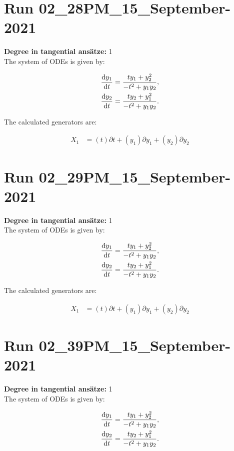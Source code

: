 \section*{Run 02\_28PM\_15\_September-2021}
\textbf{Degree in tangential ansätze:}	1\\
The system of ODEs is given by:

\begin{align*}
\dv{y_{1}}{t}&=\frac{t y_{1} + y_{2}^{2}}{- t^{2} + y_{1} y_{2}},\\
\dv{y_{2}}{t}&=\frac{t y_{2} + y_{1}^{2}}{- t^{2} + y_{1} y_{2}}.\\
\end{align*}

\noindent The calculated generators are:

\begin{align*}
X_{1}&=\left( t \right)\partial t+\left( y_{1} \right)\partial y_{1}+\left( y_{2} \right)\partial y_{2}\end{align*}
\section*{Run 02\_29PM\_15\_September-2021}
\textbf{Degree in tangential ansätze:}	1\\
The system of ODEs is given by:

\begin{align*}
\dv{y_{1}}{t}&=\frac{t y_{1} + y_{2}^{2}}{- t^{2} + y_{1} y_{2}},\\
\dv{y_{2}}{t}&=\frac{t y_{2} + y_{1}^{2}}{- t^{2} + y_{1} y_{2}}.\\
\end{align*}

\noindent The calculated generators are:

\begin{align*}
X_{1}&=\left( t \right)\partial t+\left( y_{1} \right)\partial y_{1}+\left( y_{2} \right)\partial y_{2}\end{align*}
\section*{Run 02\_39PM\_15\_September-2021}
\textbf{Degree in tangential ansätze:}	1\\
The system of ODEs is given by:

\begin{align*}
\dv{y_{1}}{t}&=\frac{t y_{1} + y_{2}^{2}}{- t^{2} + y_{1} y_{2}},\\
\dv{y_{2}}{t}&=\frac{t y_{2} + y_{1}^{2}}{- t^{2} + y_{1} y_{2}}.\\
\end{align*}

